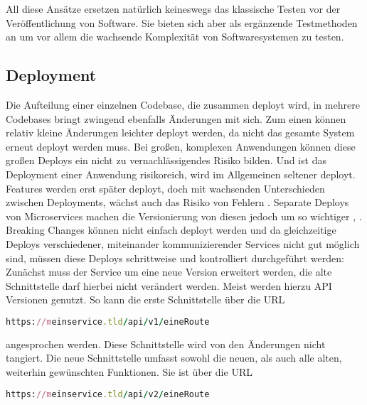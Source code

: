 All diese Ansätze ersetzen natürlich keineswegs das klassische Testen vor der Veröffentlichung von Software. Sie bieten sich aber als ergänzende Testmethoden an um vor allem die wachsende Komplexität von Softwaresystemen zu testen.

\subsection{Deployment}
Die Aufteilung einer einzelnen Codebase, die zusammen deployt wird, in mehrere Codebases bringt zwingend ebenfalls Änderungen mit sich.
Zum einen können relativ kleine Änderungen leichter deployt werden, da nicht das gesamte System erneut deployt werden muss. Bei großen, komplexen Anwendungen können diese großen Deploys ein nicht zu vernachlässigendes Risiko bilden. Und ist das Deployment einer Anwendung risikoreich, wird im Allgemeinen seltener deployt. Features werden erst später deployt, doch mit wachsenden Unterschieden zwischen Deployments, wächst auch das Risiko von Fehlern \cite[vgl.][Seite 6]{newman2015building}.
Separate Deploys von Microservices machen die Versionierung von diesen jedoch um so wichtiger \cite[vgl.][Seite 62]{newman2015building}, \cite[vgl.][]{Vergleichsartikel}. Breaking Changes können nicht einfach deployt werden und da gleichzeitige Deploys verschiedener, miteinander kommunizierender Services nicht gut möglich sind, müssen diese Deploys schrittweise und kontrolliert durchgeführt werden: Zunächst muss der Service um eine neue Version erweitert werden, die alte Schnittstelle darf hierbei nicht verändert werden. Meist werden hierzu API Versionen genutzt. So kann die erste Schnittstelle über die URL

\begin{lstlisting}[language=Ruby]
https://meinservice.tld/api/v1/eineRoute
\end{lstlisting}

\noindent angesprochen werden. Diese Schnittstelle wird von den Änderungen nicht tangiert. Die neue Schnittstelle umfasst sowohl die neuen, als auch alle alten, weiterhin gewünschten Funktionen. Sie ist über die URL

\begin{lstlisting}[language=Ruby]
https://meinservice.tld/api/v2/eineRoute
\end{lstlisting}

